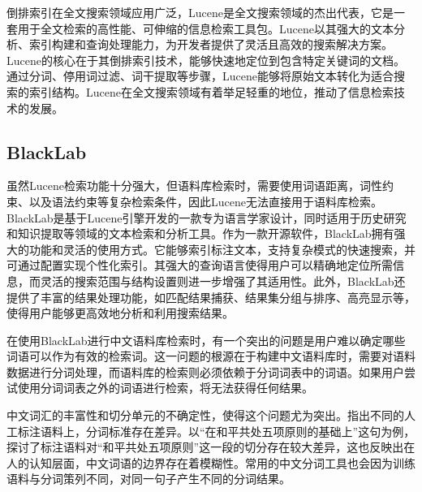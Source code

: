 \documentclass[11pt]{article}
\begin{document}
\begin{CJK*}{UTF8}{gbsn}
倒排索引在全文搜索领域应用广泛，Lucene是全文搜索领域的杰出代表，它是一套用于全文检索的高性能、可伸缩的信息检索工具包。Lucene以其强大的文本分析、索引构建和查询处理能力，为开发者提供了灵活且高效的搜索解决方案。Lucene的核心在于其倒排索引技术，能够快速地定位到包含特定关键词的文档。通过分词、停用词过滤、词干提取等步骤，Lucene能够将原始文本转化为适合搜索的索引结构。Lucene在全文搜索领域有着举足轻重的地位，推动了信息检索技术的发展。

\subsection{BlackLab}

虽然Lucene检索功能十分强大，但语料库检索时，需要使用词语距离，词性约束、以及语法约束等复杂检索条件，因此Lucene无法直接用于语料库检索。BlackLab是基于Lucene引擎开发的一款专为语言学家设计，同时适用于历史研究和知识提取等领域的文本检索和分析工具。作为一款开源软件，BlackLab拥有强大的功能和灵活的使用方式。它能够索引标注文本，支持复杂模式的快速搜索，并可通过配置实现个性化索引。其强大的查询语言使得用户可以精确地定位所需信息，而灵活的搜索范围与结构设置则进一步增强了其适用性。此外，BlackLab还提供了丰富的结果处理功能，如匹配结果捕获、结果集分组与排序、高亮显示等，使得用户能够更高效地分析和利用搜索结果。


在使用BlackLab进行中文语料库检索时，有一个突出的问题是用户难以确定哪些词语可以作为有效的检索词。这一问题的根源在于构建中文语料库时，需要对语料数据进行分词处理，而语料库的检索则必须依赖于分词词表中的词语。如果用户尝试使用分词词表之外的词语进行检索，将无法获得任何结果。

中文词汇的丰富性和切分单元的不确定性，使得这个问题尤为突出。\cite{zhangwenjing}指出不同的人工标注语料上，分词标准存在差异。以“在和平共处五项原则的基础上”这句为例，探讨了标注语料对“和平共处五项原则”这一段的切分存在较大差异，这也反映出在人的认知层面，中文词语的边界存在着模糊性。常用的中文分词工具也会因为训练语料与分词策列不同，对同一句子产生不同的分词结果。


\end{CJK*}
\end{document}

